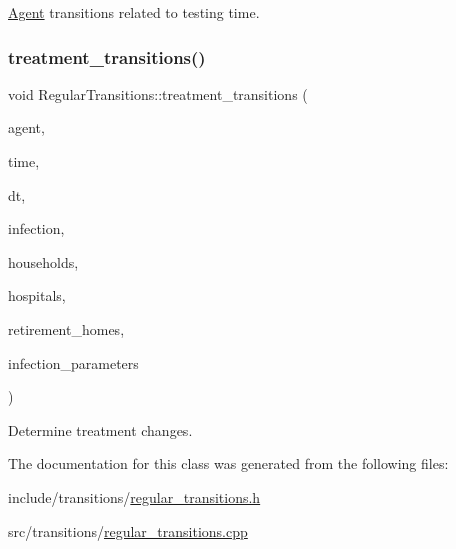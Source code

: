 \hyperlink{classAgent}{Agent} transitions related to testing time. 

\mbox{\label{classRegularTransitions_a6e0b4dd6c6fa8b9e252951f794d46302}} 
\subsubsection{\texorpdfstring{treatment\+\_\+transitions()}{treatment\_transitions()}}
{\footnotesize\ttfamily void Regular\+Transitions\+::treatment\+\_\+transitions (\begin{DoxyParamCaption}\item[{\hyperlink{classAgent}{Agent} \&}]{agent,  }\item[{const double}]{time,  }\item[{const double}]{dt,  }\item[{\hyperlink{classInfection}{Infection} \&}]{infection,  }\item[{std\+::vector$<$ \hyperlink{classHousehold}{Household} $>$ \&}]{households,  }\item[{std\+::vector$<$ \hyperlink{classHospital}{Hospital} $>$ \&}]{hospitals,  }\item[{std\+::vector$<$ \hyperlink{classRetirementHome}{Retirement\+Home} $>$ \&}]{retirement\+\_\+homes,  }\item[{const std\+::map$<$ std\+::string, double $>$ \&}]{infection\+\_\+parameters }\end{DoxyParamCaption})}



Determine treatment changes. 



The documentation for this class was generated from the following files\+:\begin{DoxyCompactItemize}
\item 
include/transitions/\hyperlink{regular__transitions_8h}{regular\+\_\+transitions.\+h}\item 
src/transitions/\hyperlink{regular__transitions_8cpp}{regular\+\_\+transitions.\+cpp}\end{DoxyCompactItemize}

